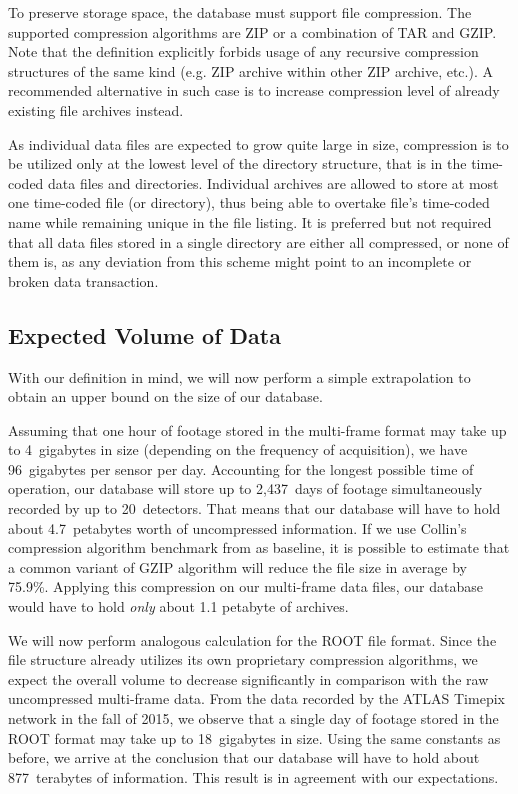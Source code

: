 
To preserve storage space, the database must support file compression. The supported compression algorithms are ZIP or a combination of TAR and GZIP. Note that the definition explicitly forbids usage of any recursive compression structures of the same kind (e.g. ZIP archive within other ZIP archive, etc.). A recommended alternative in such case is to increase compression level of already existing file archives instead.

As individual data files are expected to grow quite large in size, compression is to be utilized only at the lowest level of the directory structure, that is in the time-coded data files and directories. Individual archives are allowed to store at most one time-coded file (or directory), thus being able to overtake file's time-coded name while remaining unique in the file listing. It is preferred but not required that all data files stored in a single directory are either all compressed, or none of them is, as any deviation from this scheme might point to an incomplete or broken data transaction.

\todo

\subsection{Expected Volume of Data}
With our definition in mind, we will now perform a simple extrapolation to obtain an upper bound on the size of our database.

Assuming that one hour of footage stored in the multi-frame format may take up to 4~gigabytes in size (depending on the frequency of acquisition), we have 96~gigabytes per sensor per day. Accounting for the longest possible time of operation, our database will store up to 2,437~days of footage simultaneously recorded by up to 20~detectors. That means that our database will have to hold about 4.7~petabytes worth of uncompressed information. If we use Collin's compression algorithm benchmark from \cite{GzipBenchmark} as baseline, it is possible to estimate that a common variant of GZIP algorithm will reduce the file size in average by 75.9\%. Applying this compression on our multi-frame data files, our database would have to hold \textit{only} about 1.1 petabyte of archives.

We will now perform analogous calculation for the ROOT file format. Since the file structure already utilizes its own proprietary compression algorithms, we expect the overall volume to decrease significantly in comparison with the raw uncompressed multi-frame data. From the data recorded by the ATLAS Timepix network in the fall of 2015, we observe that a single day of footage stored in the ROOT format may take up to 18~gigabytes in size. Using the same constants as before, we arrive at the conclusion that our database will have to hold about 877~terabytes of information. This result is in agreement with our expectations.

